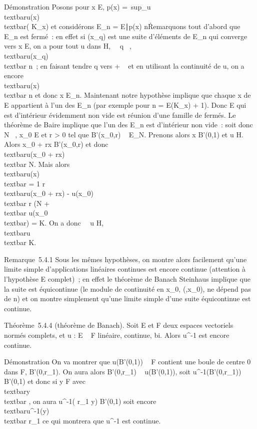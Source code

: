 \documentclass[]{article}
\begin{document}
Démonstration Posons pour x \in E, p(x) =\
sup\_u\inH\\textbar{}u(x)\\textbar{}(\leq
K\_x) et considérons E\_n = \x \in
E∣p(x) \leq n\. Remarquons tout
d'abord que E\_n est fermé~: en effet si (x\_q) est une
suite d'éléments de E\_n qui converge vers x \in E, on a pour tout
u dans H, \forall~~q \in \mathbb{N}~,
\\textbar{}u(x\_q)\\textbar{} \leq
n~; en faisant tendre q vers + \infty~ et en utilisant la continuité de u, on
a encore \\textbar{}u(x)\\textbar{} \leq n et
donc x \in E\_n. Maintenant notre hypothèse implique que chaque x
de E appartient à l'un des E\_n (par exemple pour n =
E(K\_x) + 1). Donc E qui est d'intérieur évidemment non vide est
réunion d'une famille de fermés. Le théorème de Baire implique que l'un
des E\_n est d'intérieur non vide~: soit donc N \in \mathbb{N}~,
x\_0 \in E et r \textgreater{} 0 tel que B'(x\_0,r) \subset~
E\_N. Prenons alors x \in B'(0,1) et u \in H. Alors x\_0 +
rx \in B'(x\_0,r) et donc \\textbar{}u(x\_0
+ rx)\\textbar{} \leq N. Mais alors
\\textbar{}u(x)\\textbar{} = 1
\over r \\textbar{}u(x\_0 + rx)
- u(x\_0)\\textbar{}  \over
r (N +\\textbar{}
u(x\_0\\textbar{}) = K. On a donc
\forall~~u \in H,
\\textbar{}u\\textbar{} \leq K.

Remarque~5.4.1 Sous les mêmes hypothèses, on montre alors facilement
qu'une limite simple d'applications linéaires continues est encore
continue (attention à l'hypothèse E complet)~; en effet le théorème de
Banach Steinhaus implique que la suite est équicontinue (le module de
continuité en x\_0, \eta(\epsilon,x\_0), ne dépend pas de n) et on
montre simplement qu'une limite simple d'une suite équicontinue est
continue.

Théorème~5.4.4 (théorème de Banach). Soit E et F deux espaces vectoriels
normés complets, et u : E \rightarrow~ F linéaire, continue, bi\jmathective. Alors
u^-1 est encore continue.

Démonstration On va montrer que u(B'(0,1)) \subset~ F contient une boule de
centre 0 dans F, B'(0,r\_1). On aura alors B'(0,r\_1) \subset~
u(B'(0,1)), soit u^-1(B'(0,r\_1)) \subset~ B'(0,1) et donc
si y \in F avec \\textbar{}y\\textbar{} ,
on aura u^-1( r\_1  y) \in
B'(0,1) soit encore
\\textbar{}u^-1(y)\\textbar{}
 \over r\_1 ce qui montrera que
u^-1 est continue.
\end{document}
